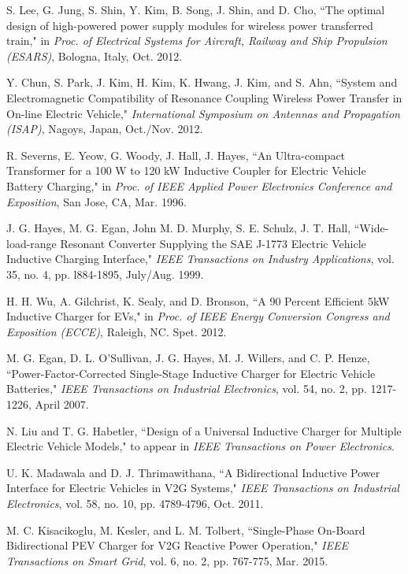 \documentclass[twocolumn,10pt]{IEEEtran}
\begin{document}
\begin{thebibliography}{99}
S. Lee, G. Jung, S. Shin, Y. Kim, B. Song, J. Shin, and D. Cho, ``The optimal design of high-powered power supply modules for wireless power transferred train," in \emph{Proc. of Electrical Systems for Aircraft, Railway and Ship Propulsion (ESARS)}, Bologna, Italy, Oct. 2012.


 Y. Chun, S. Park, J. Kim, H. Kim, K. Hwang, J. Kim, and S. Ahn, ``System and Electromagnetic Compatibility of Resonance Coupling Wireless Power Transfer in On-line Electric Vehicle,"
\emph{International Symposium on Antennas and Propagation (ISAP)}, Nagoys, Japan, Oct./Nov. 2012.

 R. Severns, E. Yeow, G. Woody, J. Hall, J. Hayes, ``An Ultra-compact Transformer for a 100 W to 120 kW Inductive Coupler for Electric Vehicle Battery Charging," 
in \emph{Proc. of IEEE Applied Power Electronics Conference and Exposition}, San Jose, CA, Mar. 1996.  

  J. G. Hayes, M. G. Egan, John M. D. Murphy, S. E. Schulz, J. T. Hall, ``Wide-load-range Resonant Converter Supplying the SAE J-1773 Electric Vehicle Inductive Charging Interface," \emph{IEEE Transactions on Industry Applications}, vol. 35, no. 4, pp. l884-1895, July/Aug. 1999. 


 


 H. H. Wu, A. Gilchrist, K. Sealy, and D. Bronson, ``A 90 Percent Efficient 5kW Inductive Charger for EVs," in \emph{Proc. of IEEE Energy Conversion Congress and Exposition (ECCE)}, Raleigh, NC. Spet. 2012.  
 
  M. G. Egan, D. L. O'Sullivan, J. G. Hayes, M. J. Willers, and C. P. Henze, ``Power-Factor-Corrected Single-Stage Inductive Charger for Electric Vehicle Batteries," \emph{IEEE Transactions on Industrial Electronics}, vol. 54, no. 2, pp. 1217-1226, April 2007.

 N. Liu and T. G. Habetler, ``Design of a Universal Inductive Charger for Multiple Electric Vehicle Models,"
to appear in \emph{IEEE Transactions on Power Electronics}.

  U. K. Madawala and D. J. Thrimawithana, ``A Bidirectional Inductive Power Interface for Electric Vehicles in V2G Systems," \emph{IEEE Transactions on Industrial Electronics}, vol. 58, no. 10, pp. 4789-4796, Oct. 2011.

 M. C. Kisacikoglu, M. Kesler, and L. M. Tolbert, ``Single-Phase On-Board Bidirectional PEV Charger for V2G Reactive Power Operation," \emph{IEEE Transactions on Smart Grid}, vol. 6, no. 2,  pp. 767-775, Mar. 2015.


\end{thebibliography}
\end{document}
